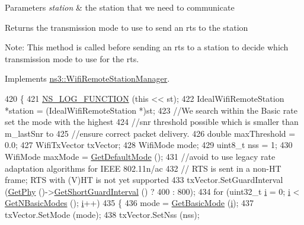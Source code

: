 \begin{DoxyParams}{Parameters}
{\em station} & the station that we need to communicate\\
\hline
\end{DoxyParams}
\begin{DoxyReturn}{Returns}
the transmission mode to use to send an rts to the station
\end{DoxyReturn}
Note\+: This method is called before sending an rts to a station to decide which transmission mode to use for the rts. 

Implements \hyperlink{classns3_1_1WifiRemoteStationManager_abf44eccb31d4b1b58644fd6721d132c9}{ns3\+::\+Wifi\+Remote\+Station\+Manager}.


\begin{DoxyCode}
420 \{
421   \hyperlink{log-macros-disabled_8h_a90b90d5bad1f39cb1b64923ea94c0761}{NS\_LOG\_FUNCTION} (\textcolor{keyword}{this} << st);
422   IdealWifiRemoteStation *station = (IdealWifiRemoteStation *)st;
423   \textcolor{comment}{//We search within the Basic rate set the mode with the highest}
424   \textcolor{comment}{//snr threshold possible which is smaller than m\_lastSnr to}
425   \textcolor{comment}{//ensure correct packet delivery.}
426   \textcolor{keywordtype}{double} maxThreshold = 0.0;
427   WifiTxVector txVector;
428   WifiMode mode;
429   uint8\_t nss = 1;
430   WifiMode maxMode = \hyperlink{classns3_1_1WifiRemoteStationManager_a54cc63cdbc8067b7f737be74a9e0081c}{GetDefaultMode} ();
431   \textcolor{comment}{//avoid to use legacy rate adaptation algorithms for IEEE 802.11n/ac}
432   \textcolor{comment}{// RTS is sent in a non-HT frame; RTS with (V)HT is not yet supported}
433   txVector.SetGuardInterval (\hyperlink{classns3_1_1WifiRemoteStationManager_ab92b49cf78e0b72a51f5d13a1f15e242}{GetPhy} ()->\hyperlink{classns3_1_1WifiRemoteStationManager_aa55f6cb04128c88710119c8289f1b17e}{GetShortGuardInterval} () ? 400 : 800);
434   \textcolor{keywordflow}{for} (uint32\_t \hyperlink{bernuolliDistribution_8m_a6f6ccfcf58b31cb6412107d9d5281426}{i} = 0; \hyperlink{bernuolliDistribution_8m_a6f6ccfcf58b31cb6412107d9d5281426}{i} < \hyperlink{classns3_1_1WifiRemoteStationManager_a1528f837dd70f82cda248f1434b94357}{GetNBasicModes} (); \hyperlink{bernuolliDistribution_8m_a6f6ccfcf58b31cb6412107d9d5281426}{i}++)
435     \{
436       mode = \hyperlink{classns3_1_1WifiRemoteStationManager_a8e4599eafc71fa98f6869e3d8908ea24}{GetBasicMode} (\hyperlink{bernuolliDistribution_8m_a6f6ccfcf58b31cb6412107d9d5281426}{i});
437       txVector.SetMode (mode);
438       txVector.SetNss (nss);

\end{DoxyCode}
